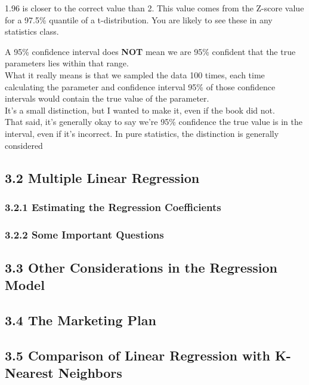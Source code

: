         \begin{note}
            1.96 is closer to the correct value than 2. This value comes from the Z-score value for a 97.5\% quantile of a t-distribution. You
            are likely to see these in any statistics class.
        \end{note}
        
        \begin{warning}
            A 95\% confidence interval does \textbf{NOT} mean we are 95\% confident that the true parameters lies within that range.\\
            What it really means is that we sampled the data 100 times, each time calculating the parameter and confidence interval 95\% of those
            confidence intervals would contain the true value of the parameter.\\
            It's a small distinction, but I wanted to make it, even if the book did    not.\\
            That said, it's generally okay to say we're 95\% confidence the true value is in the interval, even if it's incorrect. In pure statistics,
            the distinction is generally considered 
        \end{warning}
        
        \subsection*{3.2 Multiple Linear    Regression}\label{multiple-linear-regression}
        
        \subsubsection*{3.2.1 Estimating the Regression    Coefficients}\label{estimating-the-regression-coefficients}
        
        \subsubsection*{3.2.2 Some Important    Questions}\label{some-important-questions}
        
        \subsection*{3.3 Other Considerations in the Regression    Model}\label{other-considerations-in-the-regression-model}
        
        \subsection*{3.4 The Marketing Plan}\label{the-marketing-plan}
        
        \subsection*{3.5 Comparison of Linear Regression with K-Nearest Neighbors}\label{comparison-of-linear-regression-with-k-nearest-neighbors}
        
    
